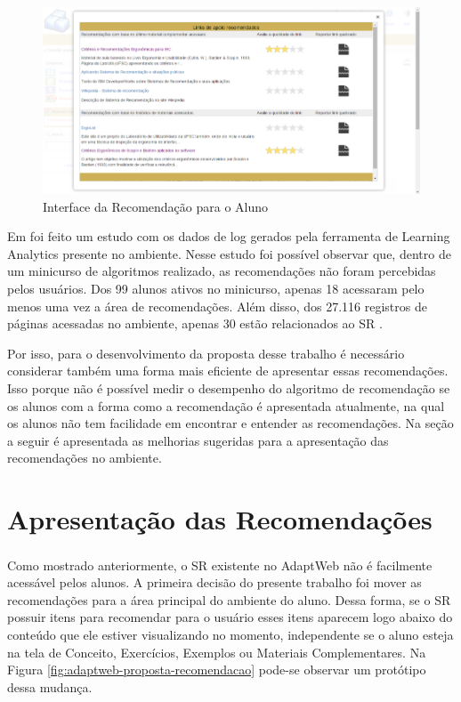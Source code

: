 \begin{figure}[htb]
  \caption{\label{fig:adaptweb-itens-recomendacao}Interface da Recomendação para o Aluno}
  \begin{center}
      \includegraphics[scale=1.0]{./Figuras/adaptweb-itens-recomendacao.png}
  \end{center}
\end{figure}

Em  foi feito um estudo com os dados de log gerados pela ferramenta de Learning Analytics
presente no ambiente. Nesse estudo foi possível observar que, dentro de um minicurso de algoritmos realizado, as
recomendações não foram percebidas pelos usuários. Dos 99 alunos ativos no minicurso, apenas 18 acessaram pelo menos
uma vez a área de recomendações. Além disso, dos 27.116 registros de páginas acessadas no ambiente, apenas 30 estão
relacionados ao SR \cite{de2017sistema}.

Por isso, para o desenvolvimento da proposta desse trabalho é necessário considerar também uma forma mais eficiente de
apresentar essas recomendações. Isso porque não é possível medir o desempenho do algoritmo de recomendação se os alunos
com a forma como a recomendação é apresentada atualmente, na qual os alunos não tem facilidade em encontrar e entender as
recomendações. Na seção a seguir é apresentada as melhorias sugeridas para a apresentação das recomendações no ambiente.

\section{Apresentação das Recomendações}

Como mostrado anteriormente, o SR existente no AdaptWeb\textsuperscript{\textregistered} não é facilmente acessável pelos
alunos. A primeira decisão do presente trabalho foi mover as recomendações para a área principal do ambiente do aluno.
Dessa forma, se o SR possuir itens para recomendar para o usuário esses itens aparecem logo abaixo do conteúdo que ele estiver
visualizando no momento, independente se o aluno esteja na tela de Conceito, Exercícios, Exemplos ou Materiais Complementares.
Na Figura \ref{fig:adaptweb-proposta-recomendacao} pode-se observar um protótipo dessa mudança.

